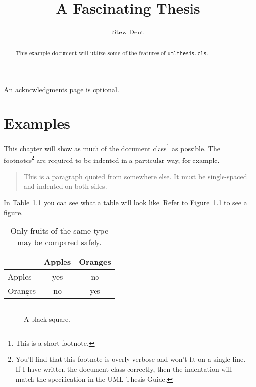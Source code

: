 \documentclass{umlthesis}
\title{A Fascinating Thesis}
\author{Stew Dent}
\begin{document}
\begin{abstract}
  This example document will utilize some of the features of \texttt{umlthesis.cls}.
\end{abstract}

\begin{acknowledgments}
An acknowledgments page is optional.
\end{acknowledgments}

\tableofcontents
\listoffigures
\listoftables

\chapter{Examples}
This chapter will show as much of the document class\footnote{This is a short footnote.} as possible. The footnotes\footnote{You'll find that this footnote is overly verbose and won't fit on a single line. If I have written the document class correctly, then the indentation will match the specification in the UML Thesis Guide.} are required to be indented in a particular way, for example.

\begin{quote}
  This is a paragraph quoted from somewhere else. It must be single-spaced and indented on both sides.
\end{quote}

In Table~\ref{tab:fruits} you can see what a table will look like. Refer to Figure~\ref{fig:square} to see a figure.

\begin{table}[h]
  \centering
  \caption[Comparison of fruits]{Only fruits of the same type may be compared safely.}
  \label{tab:fruits}
  \begin{tabular}{l|cc}
    & Apples & Oranges \\
    \hline
    Apples & yes & no \\
    Oranges & no & yes \\
  \end{tabular}
\end{table}

\lipsum[1]

\begin{figure}
  \centering
  \rule{2in}{2in}
  \caption{A black square.}
  \label{fig:square}
\end{figure}
\end{document}
